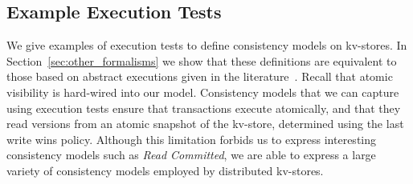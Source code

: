 % 
%


\subsection{Example Execution Tests}
\label{subsec:cm_examples}
We give examples of execution tests to define 
consistency models on kv-stores. In Section~\ref{sec:other_formalisms}
we show that these definitions  are 
equivalent to 
those based on abstract executions given in the literature~\cite{principle-eventual-consistency,framework-concur,surech-session-guarantee}.
Recall that atomic visibility is hard-wired into our model. Consistency models that we can capture using 
execution tests ensure that transactions execute atomically, and that they read versions from an atomic 
snapshot of the kv-store, determined using the last write wins policy. Although this limitation forbids us to 
express interesting consistency models such as \emph{Read Committed}, we are able to express 
a large variety of consistency models employed by distributed kv-stores.
%
%
%

